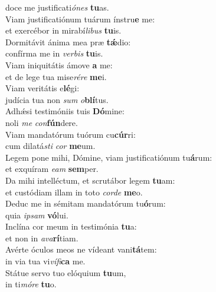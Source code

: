 \evenverse doce me justificati\textit{ó}\textit{nes} \textbf{tu}as.\\
\oddverse Viam justificatiónum tuárum ínstru\textbf{e} me:~\*\\
\oddverse et exercébor in mirabí\textit{li}\textit{bus} \textbf{tu}is.\\
\evenverse Dormitávit ánima mea præ \textbf{tǽ}dio:~\*\\
\evenverse confírma me in \textit{ver}\textit{bis} \textbf{tu}is.\\
\oddverse Viam iniquitátis ámove \textbf{a} me:~\*\\
\oddverse et de lege tua mise\textit{ré}\textit{re} \textbf{me}i.\\
\evenverse Viam veritátis e\textbf{lé}gi:~\*\\
\evenverse judícia tua non \textit{sum} \textit{o}\textbf{blí}tus.\\
\oddverse Adhǽsi testimóniis tuis \textbf{Dó}mine:~\*\\
\oddverse noli \textit{me} \textit{con}\textbf{fún}dere.\\
\evenverse Viam mandatórum tuórum cu\textbf{cúr}ri:~\*\\
\evenverse cum dilatá\textit{sti} \textit{cor} \textbf{me}um.\\
\oddverse Legem pone mihi, Dómine, viam justificatiónum tu\textbf{á}rum:~\*\\
\oddverse et exquíram \textit{e}\textit{am} \textbf{sem}per.\\
\evenverse Da mihi intelléctum, et scrutábor legem \textbf{tu}am:~\*\\
\evenverse et custódiam illam in toto \textit{cor}\textit{de} \textbf{me}o.\\
\oddverse Deduc me in sémitam mandatórum tu\textbf{ó}rum:~\*\\
\oddverse quia \textit{i}\textit{psam} \textbf{vó}lui.\\
\evenverse Inclína cor meum in testimónia \textbf{tu}a:~\*\\
\evenverse et non in \textit{a}\textit{va}\textbf{rí}tiam.\\
\oddverse Avérte óculos meos ne vídeant vani\textbf{tá}tem:~\*\\
\oddverse in via tua vi\textit{ví}\textit{fi}\textbf{ca} me.\\
\evenverse Státue servo tuo elóquium \textbf{tu}um,~\*\\
\evenverse in ti\textit{mó}\textit{re} \textbf{tu}o.\\

